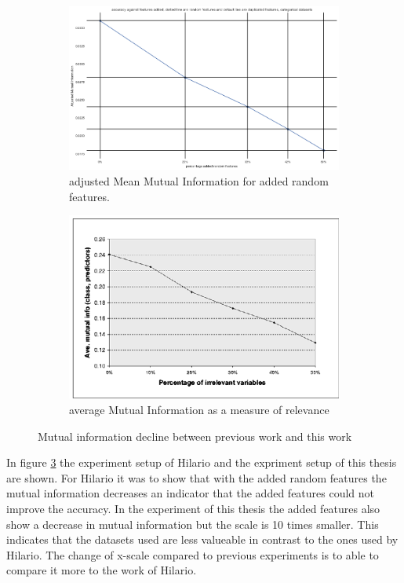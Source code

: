 \documentclass[a4paper,10pt]{article}
\begin{document}
\begin{figure}[H]
	\centering
	\begin{subfigure}[b]{0.45\textwidth}
		\includegraphics[width=\textwidth]{images/MutualInformationDecay.png}
		\caption{adjusted Mean Mutual Information for added random features.}
		\label{fig:AMMIdecay}
	\end{subfigure}
	\begin{subfigure}[b]{0.45\textwidth}
		\includegraphics[width=\textwidth]{images/MutualInformationDecay-paper.png}
		\caption{average Mutual Information as a measure of relevance}
		\label{fig:AMMIpaper}
	\end{subfigure}
	\caption{Mutual information decline between previous work and this work}\label{fig:MMIs}
	\label{paper-thesis}
\end{figure}

In figure \ref{paper-thesis} the experiment setup of Hilario and the expriment setup of this thesis are shown\cite{Resil-1}. For Hilario it was to show that with the added random features the mutual information decreases an indicator that the added features could not improve the accuracy. In the experiment of this thesis the added features also show a decrease in mutual information but the scale is 10 times smaller. This indicates that the datasets used are less valueable in contrast to the ones used by Hilario. The change of x-scale compared to previous experiments is to able to compare it more to the work of Hilario.
\end{document}
